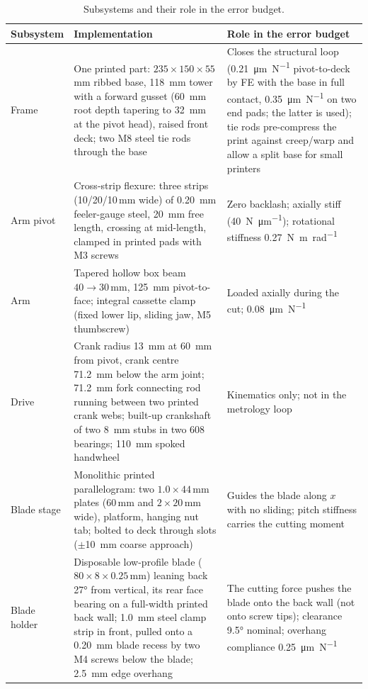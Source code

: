 \documentclass[11pt,a4paper]{article}
\begin{document}
\begin{table}[!htbp]\small\centering
\caption{Subsystems and their role in the error budget.}
\label{tab:subsystems}
\begin{tabularx}{\linewidth}{@{}p{2.3cm}XX@{}}
\toprule
Subsystem & Implementation & Role in the error budget \\
\midrule
Frame & One printed part: $235\times150\times55$\,mm ribbed base, \SI{118}{\milli\metre} tower with a forward gusset (\SI{60}{\milli\metre} root depth tapering to \SI{32}{\milli\metre} at the pivot head), raised front deck; two M8 steel tie rods through the base & Closes the structural loop (\SI{0.21}{\micro\metre\per\newton} pivot-to-deck by FE with the base in full contact, \SI{0.35}{\micro\metre\per\newton} on two end pads; the latter is used); tie rods pre-compress the print against creep/warp and allow a split base for small printers \\
Arm pivot & Cross-strip flexure: three strips (10/20/10\,mm wide) of \SI{0.20}{\milli\metre} feeler-gauge steel, \SI{20}{\milli\metre} free length, crossing at mid-length, clamped in printed pads with M3 screws & Zero backlash; axially stiff (\SI{40}{\newton\per\micro\metre}); rotational stiffness \SI{0.27}{\newton\metre\per\radian} \\
Arm & Tapered hollow box beam $40\rightarrow30$\,mm, \SI{125}{\milli\metre} pivot-to-face; integral cassette clamp (fixed lower lip, sliding jaw, M5 thumbscrew) & Loaded axially during the cut; \SI{0.08}{\micro\metre\per\newton} \\
Drive & Crank radius \SI{13}{\milli\metre} at \SI{60}{\milli\metre} from pivot, crank centre \SI{71.2}{\milli\metre} below the arm joint; \SI{71.2}{\milli\metre} fork connecting rod running between two printed crank webs; built-up crankshaft of two \SI{8}{\milli\metre} stubs in two 608 bearings; \SI{110}{\milli\metre} spoked handwheel & Kinematics only; not in the metrology loop \\
Blade stage & Monolithic printed parallelogram: two $1.0\times44$\,mm plates (60\,mm and $2\times20$\,mm wide), platform, hanging nut tab; bolted to deck through slots ($\pm$\SI{10}{\milli\metre} coarse approach) & Guides the blade along $x$ with no sliding; pitch stiffness carries the cutting moment \\
Blade holder & Disposable low-profile blade ($80\times8\times0.25$\,mm) leaning back \ang{27} from vertical, its rear face bearing on a full-width printed back wall; \SI{1.0}{\milli\metre} steel clamp strip in front, pulled onto a \SI{0.20}{\milli\metre} blade recess by two M4 screws below the blade; \SI{2.5}{\milli\metre} edge overhang & The cutting force pushes the blade onto the back wall (not onto screw tips); clearance \ang{9.5} nominal; overhang compliance \SI{0.25}{\micro\metre\per\newton} \\

\end{tabularx}
\end{table}
\end{document}
